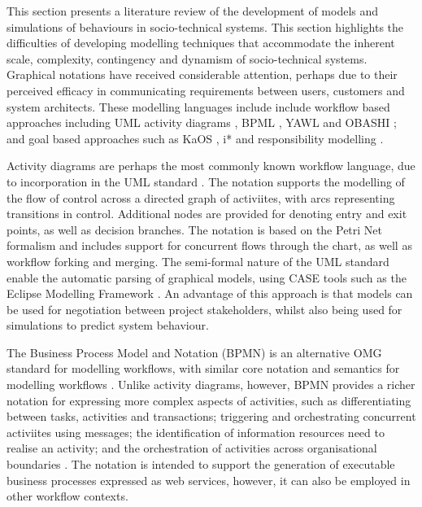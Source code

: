 \documentclass{sig-alternate}
\begin{document}
\label{sec:related}


This section presents a literature review of the development of models and
simulations of behaviours in socio-technical systems.  This section highlights
the difficulties of developing modelling techniques that accommodate the
inherent scale, complexity, contingency and dynamism of socio-technical systems.
Graphical notations have received considerable attention, perhaps due to their
perceived efficacy in communicating requirements between users, customers and
system architects.  These modelling languages include include workflow based
approaches including UML activity diagrams \citep{omg2010omguml}, BPML
\citep{White2004}, YAWL \citep{hofstede2010yawl} and OBASHI
\cite{obashimethodology}; and goal based approaches such as KaOS
\citep{Werneck2009}, i* \citep{yu1995} and responsibility modelling
\citep{sommerville09responsibility}.

Activity diagrams are perhaps the most commonly known workflow language, due to
incorporation in the UML standard \citep{omg2010omguml}.  The notation supports
the modelling of the flow of control across a directed graph of activiites, with
arcs representing transitions in control.  Additional nodes are provided for
denoting entry and exit points, as well as decision branches.  The notation is
based on the Petri Net formalism and includes support for concurrent flows
through the chart, as well as workflow forking and merging. The semi-formal
nature of the UML standard enable the automatic parsing of graphical models,
using CASE tools such as the Eclipse Modelling Framework \citep{EMFManual}.  An
advantage of this approach is that models can be used for negotiation between
project stakeholders, whilst also being used for simulations to predict system
behaviour.

The Business Process Model and Notation (BPMN) is an alternative OMG standard
for modelling workflows, with similar core notation and semantics for modelling
workflows \citep{omg2011omgbpmn}.  Unlike activity diagrams, however, BPMN
provides a richer notation for expressing more complex aspects of activities,
such as differentiating between tasks, activities and transactions; triggering
and orchestrating concurrent activiites using messages; the identification of
information resources need to realise an activity; and the orchestration of
activities across organisational boundaries \citep{White2004}.  The notation is
intended to support the generation of executable business processes expressed as
web services, however, it can also be employed in other workflow contexts.
\end{document}
